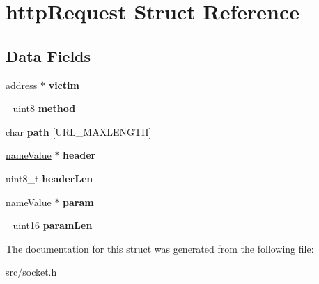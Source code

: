 \hypertarget{structhttpRequest}{
\section{httpRequest Struct Reference}
\label{structhttpRequest}
}
\subsection*{Data Fields}
\begin{DoxyCompactItemize}
\item 
\hypertarget{structhttpRequest_a0b7fdc83cbb0f0d5cfd7202317028d58}{
\hyperlink{structaddress}{address} $\ast$ {\bfseries victim}}
\label{structhttpRequest_a0b7fdc83cbb0f0d5cfd7202317028d58}

\item 
\hypertarget{structhttpRequest_a10db33d804ec1a3ceaf617058e616d5f}{
\_\-uint8 {\bfseries method}}
\label{structhttpRequest_a10db33d804ec1a3ceaf617058e616d5f}

\item 
\hypertarget{structhttpRequest_a87f061044a436d12c71c9d3f952dab78}{
char {\bfseries path} \mbox{[}URL\_\-MAXLENGTH\mbox{]}}
\label{structhttpRequest_a87f061044a436d12c71c9d3f952dab78}

\item 
\hypertarget{structhttpRequest_ab504d0bb60beedfb736b87bcb30efe15}{
\hyperlink{structnameValue}{nameValue} $\ast$ {\bfseries header}}
\label{structhttpRequest_ab504d0bb60beedfb736b87bcb30efe15}

\item 
\hypertarget{structhttpRequest_aa72e55fdb5a475856159ae94f368059a}{
uint8\_\-t {\bfseries headerLen}}
\label{structhttpRequest_aa72e55fdb5a475856159ae94f368059a}

\item 
\hypertarget{structhttpRequest_a608422a7bd5013989a0cdb8d98be8a9d}{
\hyperlink{structnameValue}{nameValue} $\ast$ {\bfseries param}}
\label{structhttpRequest_a608422a7bd5013989a0cdb8d98be8a9d}

\item 
\hypertarget{structhttpRequest_a320a6d066534907a41312036dbe2a921}{
\_\-uint16 {\bfseries paramLen}}
\label{structhttpRequest_a320a6d066534907a41312036dbe2a921}

\end{DoxyCompactItemize}


The documentation for this struct was generated from the following file:\begin{DoxyCompactItemize}
\item 
src/socket.h\end{DoxyCompactItemize}
